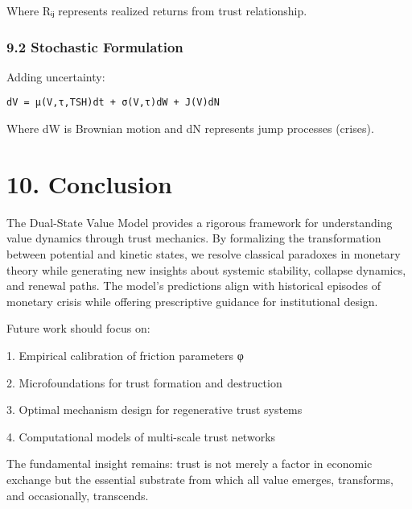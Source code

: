 \documentclass[11pt,oneside]{book}
\begin{document}
Where Rᵢⱼ represents realized returns from trust relationship.

\subsubsection{9.2 Stochastic Formulation}

Adding uncertainty:

\begin{verbatim}
dV = μ(V,τ,TSH)dt + σ(V,τ)dW + J(V)dN
\end{verbatim}

Where dW is Brownian motion and dN represents jump processes (crises).

\section{10. Conclusion}

The Dual-State Value Model provides a rigorous framework for understanding value dynamics through trust mechanics. By formalizing the transformation between potential and kinetic states, we resolve classical paradoxes in monetary theory while generating new insights about systemic stability, collapse dynamics, and renewal paths. The model's predictions align with historical episodes of monetary crisis while offering prescriptive guidance for institutional design.

Future work should focus on:

1. Empirical calibration of friction parameters φ


2. Microfoundations for trust formation and destruction


3. Optimal mechanism design for regenerative trust systems


4. Computational models of multi-scale trust networks


The fundamental insight remains: trust is not merely a factor in economic exchange but the essential substrate from which all value emerges, transforms, and occasionally, transcends.




\end{document}
